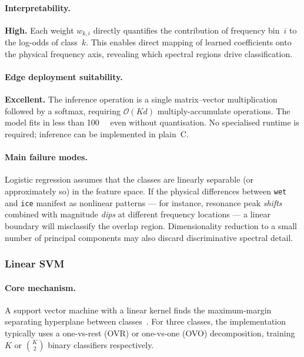 \paragraph{Interpretability.}
\textbf{High.}  Each weight $w_{k,i}$ directly quantifies the
contribution of frequency bin~$i$ to the log-odds of class~$k$.  This
enables direct mapping of learned coefficients onto the physical
frequency axis, revealing which spectral regions drive classification.

\paragraph{Edge deployment suitability.}
\textbf{Excellent.}  The inference operation is a single matrix--vector
multiplication followed by a softmax, requiring $\mathcal{O}(Kd)$
multiply-accumulate operations.  The model fits in less than
\SI{100}{\kilo\byte} even without quantisation.  No specialised
runtime is required; inference can be implemented in plain~C.

\paragraph{Main failure modes.}
Logistic regression assumes that the classes are linearly separable (or
approximately so) in the feature space.  If the physical differences
between \texttt{wet} and \texttt{ice} manifest as nonlinear patterns
--- for instance, resonance peak \emph{shifts} combined with
magnitude \emph{dips} at different frequency locations --- a linear
boundary will misclassify the overlap region.  Dimensionality reduction
to a small number of principal components may also discard discriminative
spectral detail.


\subsubsection{Linear SVM}\label{subsec:lsvm}

\paragraph{Core mechanism.}
A support vector machine with a linear kernel finds the maximum-margin
separating hyperplane between classes~\cite{cortes1995svm,
vapnik1995svm}.  For three classes, the implementation typically uses
a one-vs-rest (OVR) or one-vs-one (OVO) decomposition, training
$K$ or $\binom{K}{2}$ binary classifiers respectively.

